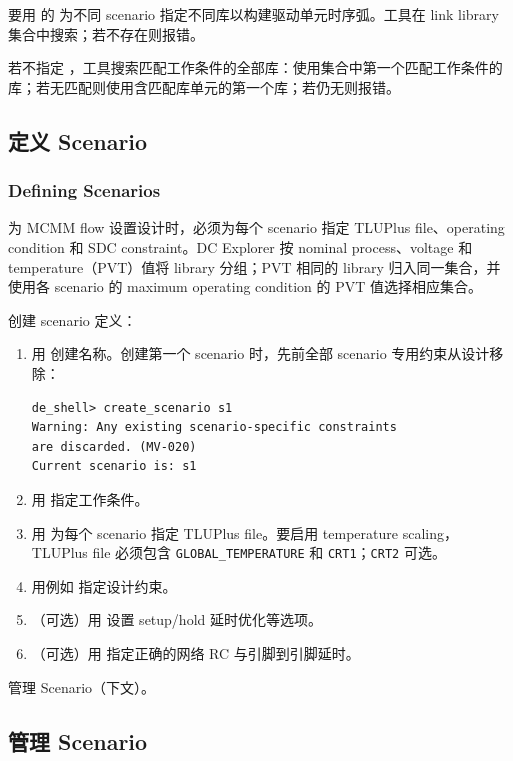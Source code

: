 要用  的  为不同 scenario 指定不同库以构建驱动单元时序弧。工具在 link library 集合中搜索；若不存在则报错。

若不指定 ，工具搜索匹配工作条件的全部库：使用集合中第一个匹配工作条件的库；若无匹配则使用含匹配库单元的第一个库；若仍无则报错。

\subsection{定义 Scenario}
\subsubsection*{Defining Scenarios}

为 MCMM flow 设置设计时，必须为每个 scenario 指定 TLUPlus file、operating condition 和 SDC constraint。DC Explorer 按 nominal process、voltage 和 temperature（PVT）值将 library 分组；PVT 相同的 library 归入同一集合，并使用各 scenario 的 maximum operating condition 的 PVT 值选择相应集合。

创建 scenario 定义：
\begin{enumerate}
  \item 用  创建名称。创建第一个 scenario 时，先前全部 scenario 专用约束从设计移除：
\begin{lstlisting}
de_shell> create_scenario s1
Warning: Any existing scenario-specific constraints
are discarded. (MV-020)
Current scenario is: s1
\end{lstlisting}
  \item 用  指定工作条件。
  \item 用  为每个 scenario 指定 TLUPlus file。要启用 temperature scaling，TLUPlus file 必须包含 \texttt{GLOBAL\_TEMPERATURE} 和 \texttt{CRT1}；\texttt{CRT2} 可选。
  \item 用例如  指定设计约束。
  \item （可选）用  设置 setup/hold 延时优化等选项。
  \item （可选）用  指定正确的网络 RC 与引脚到引脚延时。
\end{enumerate}

\begin{seeAlsoBox}
管理 Scenario（下文）。
\end{seeAlsoBox}

\subsection{管理 Scenario}
